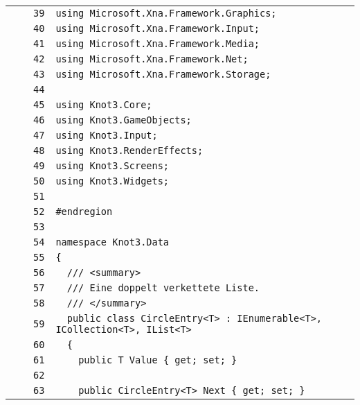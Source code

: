 \documentclass[a4paper,10pt]{article}
\begin{document}
\begin{longtable}[l]{lrrl}
\cellcolor{gray} &  & \verb~39~ & \verb~using Microsoft.Xna.Framework.Graphics;~\\
\cellcolor{gray} &  & \verb~40~ & \verb~using Microsoft.Xna.Framework.Input;~\\
\cellcolor{gray} &  & \verb~41~ & \verb~using Microsoft.Xna.Framework.Media;~\\
\cellcolor{gray} &  & \verb~42~ & \verb~using Microsoft.Xna.Framework.Net;~\\
\cellcolor{gray} &  & \verb~43~ & \verb~using Microsoft.Xna.Framework.Storage;~\\
\cellcolor{gray} &  & \verb~44~ & \verb~~\\
\cellcolor{gray} &  & \verb~45~ & \verb~using Knot3.Core;~\\
\cellcolor{gray} &  & \verb~46~ & \verb~using Knot3.GameObjects;~\\
\cellcolor{gray} &  & \verb~47~ & \verb~using Knot3.Input;~\\
\cellcolor{gray} &  & \verb~48~ & \verb~using Knot3.RenderEffects;~\\
\cellcolor{gray} &  & \verb~49~ & \verb~using Knot3.Screens;~\\
\cellcolor{gray} &  & \verb~50~ & \verb~using Knot3.Widgets;~\\
\cellcolor{gray} &  & \verb~51~ & \verb~~\\
\cellcolor{gray} &  & \verb~52~ & \verb~#endregion~\\
\cellcolor{gray} &  & \verb~53~ & \verb~~\\
\cellcolor{gray} &  & \verb~54~ & \verb~namespace Knot3.Data~\\
\cellcolor{gray} &  & \verb~55~ & \verb~{~\\
\cellcolor{gray} &  & \verb~56~ & \verb~  /// <summary>~\\
\cellcolor{gray} &  & \verb~57~ & \verb~  /// Eine doppelt verkettete Liste.~\\
\cellcolor{gray} &  & \verb~58~ & \verb~  /// </summary>~\\
\cellcolor{gray} &  & \verb~59~ & \verb~  public class CircleEntry<T> : IEnumerable<T>, ICollection<T>, IList<T>~\\
\cellcolor{gray} &  & \verb~60~ & \verb~  {~\\
\cellcolor{gray} &  & \verb~61~ & \verb~    public T Value { get; set; }~\\
\cellcolor{gray} &  & \verb~62~ & \verb~~\\
\cellcolor{gray} &  & \verb~63~ & \verb~    public CircleEntry<T> Next { get; set; }~\\

\end{longtable}
\end{document}
